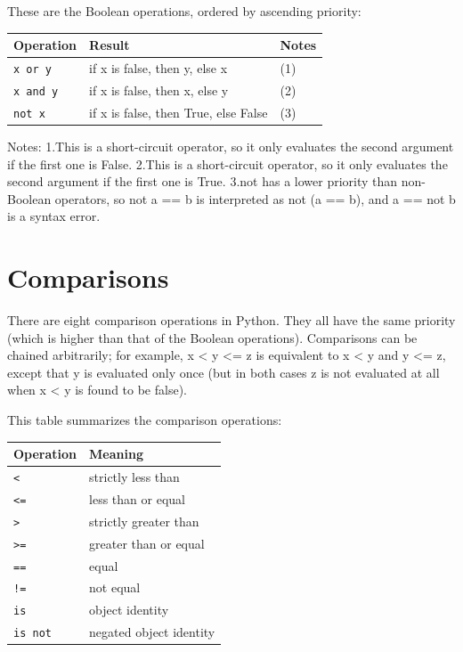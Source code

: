 These are the Boolean operations, ordered by ascending priority:



\begin{table}[ht]
	\centering
	\begin{tabular}{|l|l|l|}
		\hline
		Operation & Result & Notes\\
		\hline
		\verb|x or y| & if x is false, then y, else x &  (1) \\
		\verb|x and y| & if x is false, then x, else y & (2)  \\
		\verb|not x| & if x is false, then True, else False & (3)  \\								
		\hline
	\end{tabular}
\end{table}


  

Notes:
1.This is a short-circuit operator, so it only evaluates the second argument if the first one is False.
2.This is a short-circuit operator, so it only evaluates the second argument if the first one is True.
3.not has a lower priority than non-Boolean operators, so not a == b is interpreted as not (a == b), and a == not b is a syntax error.

\section{Comparisons}

There are eight comparison operations in Python. They all have the same priority (which is higher than that of the Boolean operations). Comparisons can be chained arbitrarily; for example, x < y <= z is equivalent to x < y and y <= z, except that y is evaluated only once (but in both cases z is not evaluated at all when x < y is found to be false).

This table summarizes the comparison operations:


\begin{table}[ht]
	\centering
	\begin{tabular}{|l|l|}
		\hline
		Operation & Meaning \\
		\hline
		\verb|<| & strictly less than \\
		\verb|<=| & less than or equal  \\							
		\verb|>| & strictly greater than \\
		\verb|>=| & greater than or equal  \\							
		\verb|==| & equal \\
		\verb|!=| & not equal  \\							
		\verb|is| & object identity \\
		\verb|is not| & negated object identity  \\							
		\hline
	\end{tabular}
\end{table}


